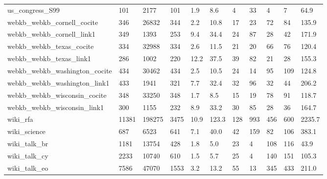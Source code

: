 \begin{longtable}{lllllllllll}
 us\_congress\_S99                                    & 101        & 2177      & 101   & 1.9    & 8.6    & 4     & 33     & 4      & 7      & 64.9    \\
 webkb\_webkb\_cornell\_cocite                         & 346        & 26832     & 344   & 2.2    & 10.8   & 17    & 23     & 72     & 84     & 135.9   \\
 webkb\_webkb\_cornell\_link1                          & 349        & 1393      & 253   & 9.4    & 34.4   & 24    & 87     & 28     & 42     & 171.9   \\
 webkb\_webkb\_texas\_cocite                           & 334        & 32988     & 334   & 2.6    & 11.5   & 21    & 20     & 66     & 76     & 120.4   \\
 webkb\_webkb\_texas\_link1                            & 286        & 1002      & 220   & 12.2   & 37.5   & 39    & 82     & 21     & 28     & 155.3   \\
 webkb\_webkb\_washington\_cocite                      & 434        & 30462     & 434   & 2.5    & 10.5   & 24    & 14     & 95     & 109    & 124.8   \\
 webkb\_webkb\_washington\_link1                       & 433        & 1941      & 321   & 7.7    & 32.4   & 32    & 96     & 32     & 44     & 206.2   \\
 webkb\_webkb\_wisconsin\_cocite                       & 348        & 33250     & 348   & 1.7    & 8.5    & 15    & 19     & 78     & 91     & 118.7   \\
 webkb\_webkb\_wisconsin\_link1                        & 300        & 1155      & 232   & 8.9    & 33.2   & 30    & 85     & 28     & 36     & 164.7   \\
 wiki\_rfa                                           & 11381      & 198275    & 3475  & 10.9   & 123.3  & 128   & 993    & 456    & 600    & 2235.7  \\
 wiki\_science                                       & 687        & 6523      & 641   & 7.1    & 40.0   & 42    & 159    & 82     & 106    & 383.1   \\
 wiki\_talk\_br                                       & 1181       & 13754     & 428   & 1.8    & 5.0    & 23    & 4      & 108    & 116    & 43.9    \\
 wiki\_talk\_cy                                       & 2233       & 10740     & 610   & 1.5    & 5.7    & 25    & 4      & 140    & 151    & 105.3   \\
 wiki\_talk\_eo                                       & 7586       & 47070     & 1553  & 3.2    & 13.2   & 55    & 13     & 345    & 433    & 211.0   \\

\end{longtable}
